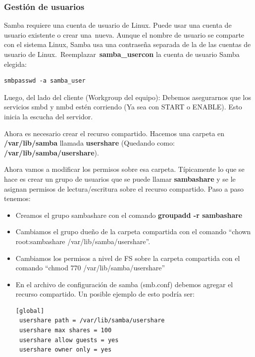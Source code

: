 \documentclass[12pt]{extarticle}
\begin{document}
\subsubsection{Gestión de usuarios}\label{gestiuxf3n-de-usuarios}

Samba requiere una cuenta de usuario de Linux. Puede usar una cuenta de
usuario existente o crear una~nueva. Aunque el nombre de usuario se
comparte con el sistema Linux, Samba usa una contraseña separada de la
de las cuentas de usuario de Linux.~Reemplazar~\textbf{samba\_usercon}
la cuenta de usuario Samba elegida:

\begin{verbatim}
smbpasswd -a samba_user
\end{verbatim}

Luego, del lado del cliente (Workgroup del equipo): Debemos asegurarnos
que los servicios smbd y nmbd estén corriendo (Ya sea con START o
ENABLE). Esto inicia la escucha del servidor.

Ahora es necesario crear el recurso compartido. Hacemos una carpeta en
\textbf{/var/lib/samba} llamada \textbf{usershare} (Quedando como:
\textbf{/var/lib/samba/usershare}).

Ahora vamos a modificar los permisos sobre esa carpeta. Típicamente lo
que se hace es crear un grupo de usuarios que se puede llamar
\textbf{sambashare} y se le asignan permisos de lectura/escritura sobre
el recurso compartido. Paso a paso tenemos:

\begin{itemize}
\item
  Creamos el grupo sambashare con el comando \textbf{groupadd -r
  sambashare}
\item
  Cambiamos el grupo dueño de la carpeta compartida con el comando
  ``chown root:sambashare /var/lib/samba/usershare''.
\item
  Cambiamos los permisos a nivel de FS sobre la carpeta compartida con
  el comando ``chmod 770 /var/lib/samba/usershare''
\item
  En el archivo de configuración de samba (smb.conf) debemos agregar el
  recurso compartido. Un posible ejemplo de esto podría ser:

\begin{verbatim}
[global]
 usershare path = /var/lib/samba/usershare
 usershare max shares = 100
 usershare allow guests = yes
 usershare owner only = yes
\end{verbatim}
\end{itemize}
\end{document}
